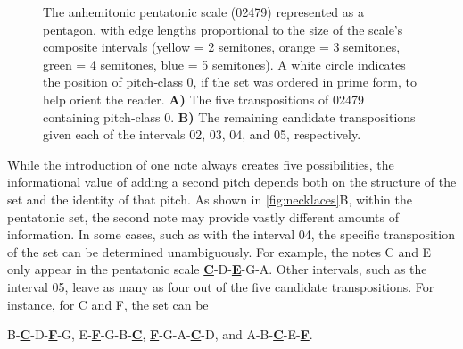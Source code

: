 \documentclass[10pt,twocolumn]{article}
\numberwithin{equation}{section} %
\begin{document}
    \begin{figure}[htbp]
        \centering
        \caption{The anhemitonic pentatonic scale (02479) represented as a pentagon, with edge lengths proportional to the size of the scale's composite intervals (yellow = 2 semitones, orange = 3 semitones, green = 4 semitones, blue = 5 semitones).
        A white circle indicates the position of pitch‑class 0, if the set was ordered in prime form, to help orient the reader.
        \textbf{A)} The five transpositions of 02479 containing pitch‑class 0.
        \textbf{B)} The remaining candidate transpositions given each of the intervals 02, 03, 04, and 05, respectively.}
        \label{fig:necklaces}
    \end{figure}

    While the introduction of one note always creates five possibilities, the informational value of adding a second pitch depends both on the structure of the set and the identity of that pitch.
    As shown in \autoref{fig:necklaces}B, within the pentatonic set, the second note may provide vastly different amounts of information.
    In some cases, such as with the interval 04, the specific transposition of the set can be determined unambiguously.
    For example, the notes C and E only appear in the pentatonic scale \textbf{\uline{C}}-D-\textbf{\uline{E}}-G-A.
    Other intervals, such as the interval 05, leave as many as four out of the five candidate transpositions.
    For instance, for C and F, the set can be

    B\text{$\flat$}-\textbf{\underline{C}}-D-\textbf{\underline{F}}-G,     E\text{$\flat$}-\textbf{\underline{F}}-G-B\text{$\flat$}-\textbf{\underline{C}},     \textbf{\underline{F}}-G-A-\textbf{\underline{C}}-D,     and     A\text{$\flat$}-B\text{$\flat$}-\textbf{\underline{C}}-E\text{$\flat$}-\textbf{\underline{F}}.
\end{document}
